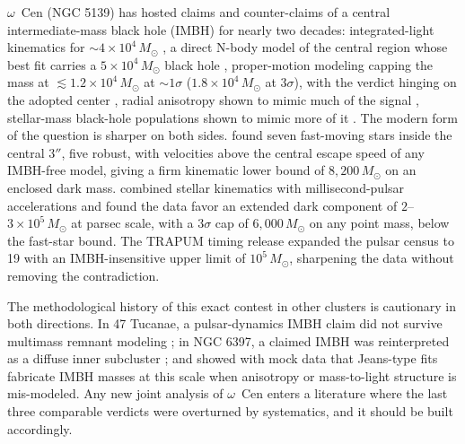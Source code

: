 \documentclass[11pt]{article}
\newcommand{\msun}{\ensuremath{M_\odot}}
\newcommand{\ocen}{$\omega$~Cen}
\begin{document}
\ocen{} (NGC 5139) has hosted claims and counter-claims of a central intermediate-mass black hole (IMBH) for nearly two decades: integrated-light kinematics for $\sim 4\times10^{4}\,\msun$ \citep{Noyola2008,Noyola2010H}, a direct N-body model of the central region whose best fit carries a $5\times10^{4}\,\msun$ black hole \citep{Jalali2012}, proper-motion modeling capping the mass at $\lesssim 1.2\times10^{4}\,\msun$ at $\sim 1\sigma$ ($1.8\times10^{4}\,\msun$ at $3\sigma$), with the verdict hinging on the adopted center \citep{vanderMarelAnderson2010}, radial anisotropy shown to mimic much of the signal \citep{Zocchi2017}, stellar-mass black-hole populations shown to mimic more of it \citep{Zocchi2018,Baumgardt2019}. The modern form of the question is sharper on both sides. \citet{Haberle2024Nature} found seven fast-moving stars inside the central $3''$, five robust, with velocities above the central escape speed of any IMBH-free model, giving a firm kinematic lower bound of $8{,}200\,\msun$ on an enclosed dark mass. \citet{BanaresHernandez2025} combined stellar kinematics with millisecond-pulsar accelerations and found the data favor an extended dark component of $2$--$3\times10^{5}\,\msun$ at parsec scale, with a $3\sigma$ cap of $6{,}000\,\msun$ on any point mass, below the fast-star bound. The TRAPUM timing release \citep{ColomiBernadich2026} expanded the pulsar census to 19 with an IMBH-insensitive upper limit of $10^{5}\,\msun$, sharpening the data without removing the contradiction.

The methodological history of this exact contest in other clusters is cautionary in both directions. In 47 Tucanae, a pulsar-dynamics IMBH claim \citep{Kiziltan2017} did not survive multimass remnant modeling \citep{Mann2019,Smith2024}; in NGC 6397, a claimed IMBH was reinterpreted as a diffuse inner subcluster \citep{VitralMamon2021}; and \citet{Aros2020} showed with mock data that Jeans-type fits fabricate IMBH masses at this scale when anisotropy or mass-to-light structure is mis-modeled. Any new joint analysis of \ocen{} enters a literature where the last three comparable verdicts were overturned by systematics, and it should be built accordingly.
\end{document}
